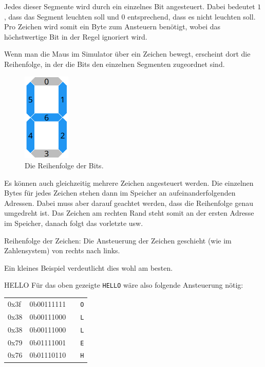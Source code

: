 Jedes dieser Segmente wird durch ein einzelnes Bit angesteuert. Dabei bedeutet $1$, dass das Segment leuchten soll und $0$ entsprechend, dass es nicht leuchten soll.
Pro Zeichen wird somit ein Byte zum Ansteuern benötigt, wobei das höchstwertige Bit in der Regel ignoriert wird.

Wenn man die Maus im Simulator über ein Zeichen bewegt, erscheint dort die Reihenfolge, in der die Bits den einzelnen Segmenten zugeordnet sind.

\begin{figure}[ht]
	\centering
  \includegraphics[width=0.2\textwidth]{Images/7-Segment_Hover}
	\caption{Die Reihenfolge der Bits.}
	\label{7-Segment_Hover}
\end{figure}

Es können auch gleichzeitig mehrere Zeichen angesteuert werden. Die einzelnen
Bytes für jedes Zeichen stehen dann im Speicher an aufeinanderfolgenden
Adressen. Dabei muss aber darauf geachtet werden, dass die Reihenfolge genau
umgedreht ist. Das Zeichen am rechten Rand steht somit an der ersten Adresse im
Speicher, danach folgt das vorletzte usw.

\begin{warningblock}
Reihenfolge der Zeichen: Die Ansteuerung der Zeichen geschieht (wie im Zahlensystem) von rechts nach links.
\end{warningblock}

Ein kleines Beispiel verdeutlicht dies wohl am besten.

\begin{exampleblock}{HELLO}
	Für das oben gezeigte \texttt{HELLO} wäre also folgende Ansteuerung nötig:

	\begin{tabular}{llll}
	0x3f & 0b00111111 & & \texttt{O}\\
	0x38 & 0b00111000 & & \texttt{L}\\
	0x38 & 0b00111000 & & \texttt{L}\\
	0x79 & 0b01111001 & & \texttt{E}\\
	0x76 & 0b01110110 & & \texttt{H}\\
	\end{tabular}
\end{exampleblock}

